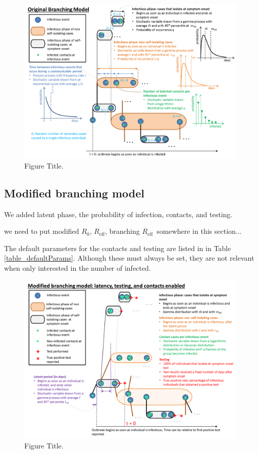 \documentclass[sr]{drdc-report}
\def\Rz{\ensuremath{R_0}}
\def\Reff{\ensuremath{R_\mathrm{eff}}}
\begin{document}
\begin{figure}
  \includegraphics[width=0.99\textwidth, keepaspectratio=true]{figures/BranchingModel}
  \caption{Figure Title.}\label{fig_branchingModel}
\end{figure}


\subsection{Modified branching model}
We added latent phase, the probability of infection, contacts, and testing. 

we need to put modified \Rz, \Reff, branching \Reff\ somewhere in this section... 

The default parameters for the contacts and testing are listed in in Table \ref{table_defaultParams}. Although these must always be set, they are not relevant when only interested in the number of infected. 

\begin{figure}
  \includegraphics[width=0.99\textwidth, keepaspectratio=true]{figures/ModifiedBranchingModel}
  \caption{Figure Title.}\label{fig_branchingModel}
\end{figure}
\end{document}
